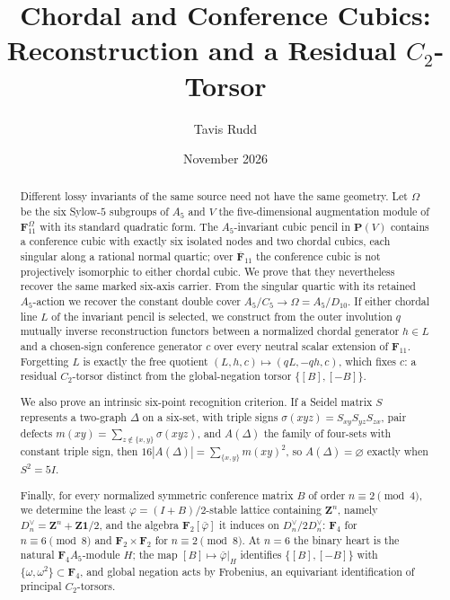\documentclass[11pt]{article}
\title{Chordal and Conference Cubics:\\
Reconstruction and a Residual \(C_2\)-Torsor}
\author{Tavis Rudd}
\date{November 2026}
\theoremstyle{definition}
\theoremstyle{remark}
\newcommand{\F}{\mathbf F}
\newcommand{\Z}{\mathbf Z}
\newcommand{\PP}{\mathbf P}
\begin{document}
\maketitle

\begin{abstract}
Different lossy invariants of the same source need not have the same
geometry.  Let \(\Omega\) be the six Sylow-\(5\) subgroups of \(A_5\) and
\(V\) the five-dimensional augmentation module of \(\F_{11}^{\Omega}\) with
its standard quadratic form.  The \(A_5\)-invariant cubic pencil in
\(\PP(V)\) contains a conference cubic with exactly six isolated nodes and two
chordal cubics, each singular along a rational normal quartic; over
\(\overline{\F}_{11}\) the conference cubic is not projectively isomorphic
to either chordal cubic.  We prove that they nevertheless recover the same
marked six-axis carrier.  From the singular quartic with its retained
\(A_5\)-action we recover the constant double cover
\(A_5/C_5\to\Omega=A_5/D_{10}\).  If either chordal line \(L\)
of the invariant pencil is selected, we construct from the outer involution
\(q\) mutually inverse reconstruction functors between a normalized chordal
generator \(h\in L\) and a chosen-sign conference generator \(c\) over every
neutral scalar extension of \(\F_{11}\).  Forgetting
\(L\) is exactly the free quotient \((L,h,c)\mapsto(qL,-qh,c)\), which fixes
\(c\): a residual \(C_2\)-torsor distinct from the global-negation torsor
\(\{[B],[-B]\}\).

We also prove an intrinsic six-point recognition criterion.  If a Seidel
matrix \(S\) represents a two-graph \(\Delta\) on a six-set, with triple
signs \(\sigma(xyz)=S_{xy}S_{yz}S_{zx}\), pair defects
\(m(xy)=\sum_{z\notin\{x,y\}}\sigma(xyz)\), and \(A(\Delta)\) the family of
four-sets with constant triple sign, then
\(16|A(\Delta)|=\sum_{\{x,y\}}m(xy)^2\), so \(A(\Delta)=\varnothing\)
exactly when \(S^2=5I\).

Finally, for every normalized symmetric conference matrix \(B\) of order
\(n\equiv2\pmod4\), we determine the least \(\varphi=(I+B)/2\)-stable
lattice containing \(\Z^n\), namely \(D_n^\vee=\Z^n+\Z\mathbf1/2\), and the
algebra \(\F_2[\bar\varphi]\) it induces on \(D_n^\vee/2D_n^\vee\):
\(\F_4\) for \(n\equiv6\pmod8\) and \(\F_2\times\F_2\) for
\(n\equiv2\pmod8\).  At \(n=6\) the binary heart is the natural
\(\F_4A_5\)-module \(H\); the map \([B]\mapsto\bar\varphi|_H\) identifies
\(\{[B],[-B]\}\) with \(\{\omega,\omega^2\}\subset\F_4\), and global
negation acts by Frobenius, an equivariant identification of principal
\(C_2\)-torsors.
\end{abstract}
\end{document}
